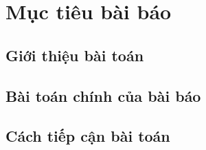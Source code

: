 
\chapter{Mục tiêu bài báo}
\section{Giới thiệu bài toán}

\section{Bài toán chính của bài báo}

\section{Cách tiếp cận bài toán}


